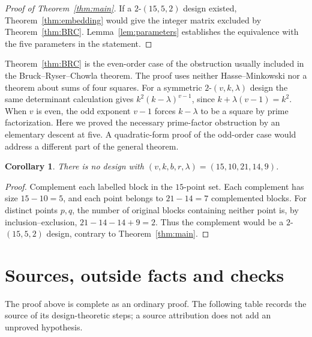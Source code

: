 \documentclass[11pt]{article}
\newtheorem{corollary}[theorem]{Corollary}
\theoremstyle{definition}
\begin{document}
\begin{proof}[Proof of Theorem~\ref{thm:main}]
If a $2$-$(15,5,2)$ design existed, Theorem~\ref{thm:embedding} would
give the integer matrix excluded by Theorem~\ref{thm:BRC}.
Lemma~\ref{lem:parameters} establishes the equivalence with the five
parameters in the statement.
\end{proof}

Theorem~\ref{thm:BRC} is the even-order case of the obstruction
usually included in the Bruck--Ryser--Chowla theorem. The proof uses
neither Hasse--Minkowski nor a theorem about sums of four squares.
For a symmetric $2$-$(v,k,\lambda)$ design the same determinant
calculation gives $k^2(k-\lambda)^{v-1}$, since
$k+\lambda(v-1)=k^2$. When $v$ is even, the odd exponent $v-1$
forces $k-\lambda$ to be a square by prime factorization. Here we
proved the necessary prime-factor obstruction by an elementary
descent at five. A quadratic-form proof of the odd-order case would
address a different part of the general theorem.

\begin{corollary}\label{cor:complement}
There is no design with $(v,k,b,r,\lambda)=(15,10,21,14,9)$.
\end{corollary}
\begin{proof}
Complement each labelled block in the $15$-point set. Each complement
has size $15-10=5$, and each point belongs to $21-14=7$ complemented
blocks. For distinct points $p,q$, the number of original blocks
containing neither point is, by inclusion--exclusion,
$21-14-14+9=2$. Thus the complement would be a $2$-$(15,5,2)$ design,
contrary to Theorem~\ref{thm:main}.
\end{proof}

\section{Sources, outside facts and checks}\label{sec:checks}

The proof above is complete as an ordinary proof. The following table
records the source of its design-theoretic steps; a source attribution
does not add an unproved hypothesis.
\end{document}
